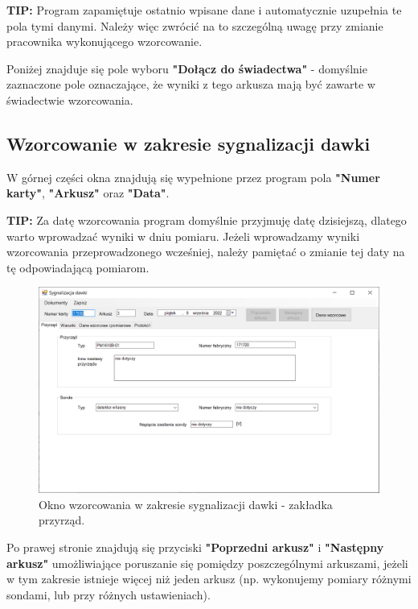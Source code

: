 	\textbf{TIP:} Program zapamiętuje ostatnio wpisane dane i automatycznie uzupełnia te pola tymi danymi. Należy więc zwrócić na to szczególną uwagę przy zmianie pracownika wykonującego wzorcowanie.
	
	Poniżej znajduje się pole wyboru \textbf{"Dołącz do świadectwa"} - domyślnie zaznaczone pole oznaczające, że wyniki z tego arkusza mają być zawarte w świadectwie wzorcowania.

\subsection{Wzorcowanie w zakresie sygnalizacji dawki}
\label{wzorcowanie_syg_dawka}
	
	W górnej części okna znajdują się wypełnione przez program pola \textbf{"Numer karty"}, \textbf{"Arkusz"} oraz \textbf{"Data"}. 
	
	\textbf{TIP:} Za datę wzorcowania program domyślnie przyjmuję datę dzisiejszą, dlatego warto wprowadzać wyniki w dniu pomiaru. Jeżeli wprowadzamy wyniki wzorcowania przeprowadzonego wcześniej, należy pamiętać o zmianie tej daty na tę odpowiadającą pomiarom.
	
	\begin{figure}[htb]
		\centering
		\includegraphics[width=\columnwidth]{obrazki/Wzorcowanie/syg_dawki/przyrzad.png}
		\caption{Okno wzorcowania w zakresie sygnalizacji dawki - zakładka przyrząd.}
		\label{sygDawkiPrzyrzad}
	\end{figure}
	
	Po prawej stronie znajdują się przyciski \textbf{"Poprzedni arkusz"} i \textbf{"Następny arkusz"} umożliwiające poruszanie się pomiędzy poszczególnymi arkuszami, jeżeli w tym zakresie istnieje więcej niż jeden arkusz (np. wykonujemy pomiary różnymi sondami, lub przy różnych ustawieniach).
	
